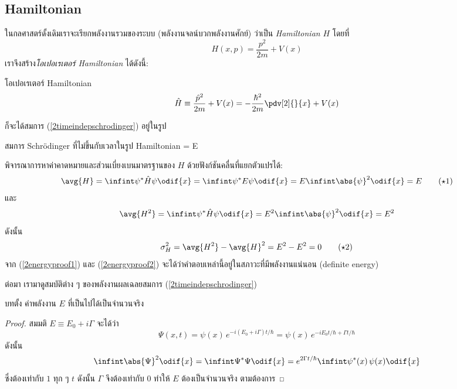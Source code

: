 \subsection{Hamiltonian}

ในกลศาสตร์ดั้งเดิมเราจะเรียกพลังงานรวมของระบบ (พลังงานจลน์บวกพลังงานศักย์) ว่าเป็น \emph{Hamiltonian} $H$ โดยที่
\[
	H(x, p) = \frac{p^2}{2m} + V(x)
\]
เราจึงสร้าง\emph{โอเปอเรเตอร์ Hamiltonian} ได้ดังนี้:
\begin{defbox}{โอเปอเรเตอร์ Hamiltonian}
    \begin{equation*}
        \hat{H} \equiv \frac{\hat{p}^2}{2m} + V(x) = -\frac{\hbar^2}{2m}\pdv[2]{}{x} + V(x)
    \end{equation*}
\end{defbox}
ก็จะได้สมการ (\ref{2timeindepschrodinger}) อยู่ในรูป
\begin{eqbox}{สมการ Schrödinger ที่ไม่ขึ้นกับเวลาในรูป Hamiltonian}
    \psi = E\psi
\end{eqbox}

พิจารณาการหาค่าคาดหมายและส่วนเบี่ยงเบนมาตรฐานของ $H$ ด้วยฟังก์ชันคลื่นที่แยกตัวแปรได้:
\begin{equation}
    \avg{H} = \infint \psi^*\hat{H}\psi\odif{x} = \infint \psi^* E\psi\odif{x} = E \infint \abs{\psi}^2 \odif{x} = E\tag{$\star$1}\label{2energyproof1}
\end{equation}
และ
\[
	\avg{H^2} = \infint \psi^*\hat{H}\psi\odif{x} = E^2\infint\abs{\psi}^2\odif{x} = E^2
\]
ดังนั้น
\begin{equation}
    \sigma_H^2 = \avg{H^2} - \avg{H}^2 = E^2 - E^2 = 0\tag{$\star$2}\label{2energyproof2}
\end{equation}
จาก (\ref{2energyproof1}) และ (\ref{2energyproof2}) จะได้ว่าคำตอบเหล่านี้อยู่ในสภาวะที่มีพลังงานแน่นอน (definite energy)

ต่อมา เรามาดูสมบัติต่าง ๆ ของพลังงานผลเฉลยสมการ (\ref{2timeindepschrodinger})

\begin{corbox}{บทตั้ง}
    ค่าพลังงาน $E$ ที่เป็นไปได้เป็นจำนวนจริง
\end{corbox}
\begin{proof}
    สมมติ $E \equiv E_0 + i\Gamma$ จะได้ว่า
    \[
	    \Psi(x, t) = \psi(x)\,e^{-i(E_0 + i\Gamma)t/\hbar} = \psi(x)\,e^{-iE_0t/\hbar + \Gamma t/\hbar}
    \]
    ดังนั้น
    \[
	    \infint \abs{\Psi}^2\odif{x} = \infint \Psi^*\Psi\odif{x} = e^{2\Gamma t/\hbar}\infint \psi^*(x)\,\psi(x)\odif{x}
    \]
    ซึ่งต้องเท่ากับ $1$ ทุก ๆ $t$ ดังนั้น $\Gamma$ จึงต้องเท่ากับ $0$ ทำให้ $E$ ต้องเป็นจำนวนจริง ตามต้องการ
\end{proof}

